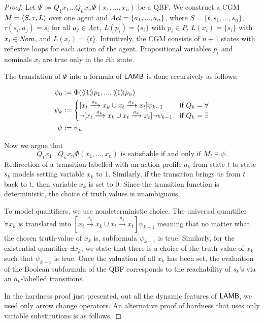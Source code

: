 {\begin{proof}
Let $\Psi := Q_1 x_1 ... Q_n x_n \Phi (x_1, ..., x_n)$ be a QBF. We construct a CGM $M = \langle S, \tau, L\rangle$ over one agent and $\mathit{Act} = \{a_1, ..., a_n\}$, where $S = \{t, s_1, ..., s_{n}\}$, $\tau(s_i, a_j) = s_i$ for all $a_j \in \mathit{Act}$, $L(p_i) = \{s_i\}$ with $p_i \in P$, $L(x_i) = \{s_i\}$ with $x_i \in \mathit{Nom}$, and $L(x_t) = \{t\}$. Intuitively, the CGM consists of $n+1$ states with reflexive loops for each action of the agent. Propositional variables $p_i$ and nominals $x_i$ are true only in the $i$th state. 

The translation of $\Psi$ into a formula of $\mathsf{LAMB}$ is done recursively as follows:

\begin{align*}
    \psi_0 &:= \Phi(\langle \! \langle 1 \rangle \! \rangle p_1, ..., \langle \! \langle 1 \rangle \! \rangle p_n) \\
    \psi_k &:=
    \begin{cases}
        [x_t \xrightarrow{a_k} x_k \cup x_t \xrightarrow{a_k} x_t] \psi_{k-1} &\text{if } Q_k = \forall\\ 
        \lnot [x_t \xrightarrow{a_k} x_k \cup x_t \xrightarrow{a_k} x_t] \lnot \psi_{k-1} &\text{if } Q_k = \exists\\
    \end{cases}\\
\psi &:= \psi_n
\end{align*}

Now we argue that 
\[Q_1 x_1 ... Q_n x_n \Phi (x_1, ..., x_n) \text{ is satisfiable if and only if } M_t \models \psi.\]
Redirection of a transition labelled with an action profile $a_k$ from state $t$ to state $s_k$ models setting variable $x_k$ to 1. Similarly, if the transition brings us from $t$ back to $t$, then variable $x_k$ is set to 0. Since the transition function is deterministic, the choice of truth values is unambiguous. 

To model quantifiers, we use nondeterministic choice. The universal quantifier $\forall x_k$ is translated into $[x_t \xrightarrow{a_k} x_k \cup x_t \xrightarrow{a_k} x_t] \psi_{k-1}$ meaning that no matter what the chosen truth-value of $x_k$ is, subformula $\psi_{k-1}$ is true. Similarly, for the existential quantifier $\exists x_k$, we state that there is a choice of the truth-value of $x_k$ such that $\psi_{k-1}$ is true. Once the valuation of all $x_k$ has been set, the evaluation of the Boolean subformula of the QBF corresponds to the reachability of $s_k$'s via an $a_k$-labelled transitions. 

In the hardness proof just presented, out all the dynamic features of $\mathsf{LAMB}$, we used only arrow change operators. An alternative proof of hardness that uses only variable substitutions is as follows.  


\end{proof}}
